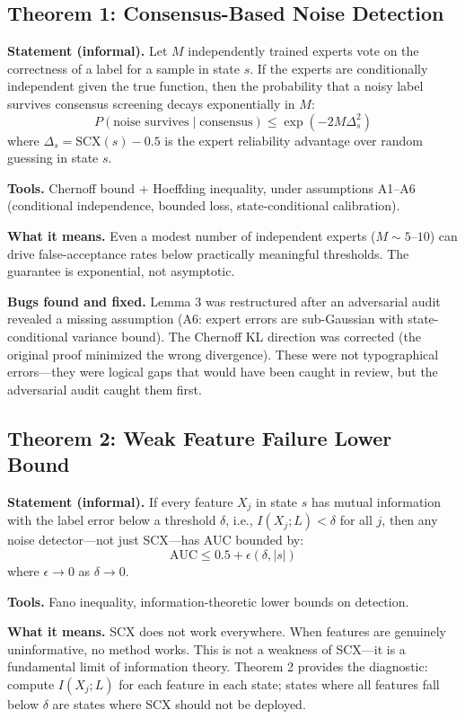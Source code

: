 \documentclass[12pt,a4paper]{ctexart}
\begin{document}
\subsection{Theorem 1: Consensus-Based Noise Detection}

\textbf{Statement (informal).} Let $M$ independently trained experts vote on the correctness of a label for a sample in state $s$. If the experts are conditionally independent given the true function, then the probability that a noisy label survives consensus screening decays exponentially in $M$:
\[
P(\text{noise survives} \mid \text{consensus}) \leq \exp(-2M\Delta_s^2)
\]
where $\Delta_s = \text{SCX}(s) - 0.5$ is the expert reliability advantage over random guessing in state $s$.

\textbf{Tools.} Chernoff bound + Hoeffding inequality, under assumptions A1–A6 (conditional independence, bounded loss, state-conditional calibration).

\textbf{What it means.} Even a modest number of independent experts ($M \sim 5$–$10$) can drive false-acceptance rates below practically meaningful thresholds. The guarantee is exponential, not asymptotic.

\textbf{Bugs found and fixed.} Lemma 3 was restructured after an adversarial audit revealed a missing assumption (A6: expert errors are sub-Gaussian with state-conditional variance bound). The Chernoff KL direction was corrected (the original proof minimized the wrong divergence). These were not typographical errors—they were logical gaps that would have been caught in review, but the adversarial audit caught them first.

\subsection{Theorem 2: Weak Feature Failure Lower Bound}

\textbf{Statement (informal).} If every feature $X_j$ in state $s$ has mutual information with the label error below a threshold $\delta$, i.e., $I(X_j; L) < \delta$ for all $j$, then any noise detector—not just SCX—has AUC bounded by:
\[
\text{AUC} \leq 0.5 + \epsilon(\delta, |s|)
\]
where $\epsilon \to 0$ as $\delta \to 0$.

\textbf{Tools.} Fano inequality, information-theoretic lower bounds on detection.

\textbf{What it means.} SCX does not work everywhere. When features are genuinely uninformative, no method works. This is not a weakness of SCX—it is a fundamental limit of information theory. Theorem 2 provides the diagnostic: compute $I(X_j; L)$ for each feature in each state; states where all features fall below $\delta$ are states where SCX should not be deployed.
\end{document}
